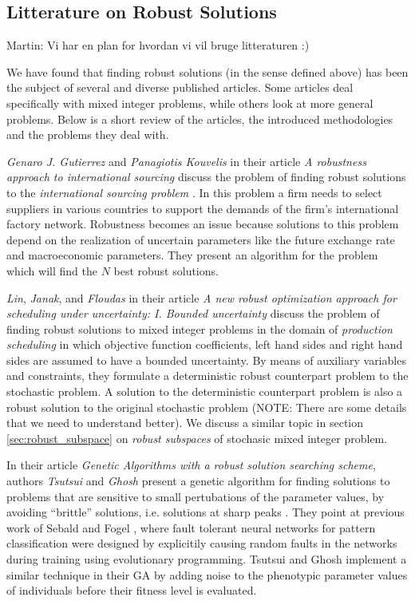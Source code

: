 \subsection{Litterature on Robust Solutions}

Martin: Vi har en plan for hvordan vi vil bruge litteraturen :)

We have found that finding robust solutions (in the sense defined
above) has been the subject of several and diverse published
articles. Some articles deal specifically with mixed integer problems,
while others look at more general problems. Below is a short review of
the articles, the introduced methodologies and the problems they deal
with.

\emph{Genaro J. Gutierrez} and \emph{Panagiotis Kouvelis} in their
article \emph{A robustness approach to international sourcing} discuss
the problem of finding robust solutions to the \emph{international
sourcing problem} \cite{kouvelis}. In this problem a firm needs to
select suppliers in various countries to support the demands of the
firm's international factory network. Robustness becomes an issue
because solutions to this problem depend on the realization of
uncertain parameters like the future exchange rate and macroeconomic
parameters. They present an algorithm for the problem which will find
the $N$ best robust solutions.

\emph{Lin}, \emph{Janak}, and \emph{Floudas} in their article \emph{A
new robust optimization approach for scheduling under uncertainty:
I. Bounded uncertainty} discuss the problem of finding robust
solutions to mixed integer problems in the domain of \emph{production
scheduling} in which objective function coefficients, left hand sides
and right hand sides are assumed to have a bounded uncertainty. By
means of auxiliary variables and constraints, they formulate a
deterministic robust counterpart problem to the stochastic problem. A
solution to the deterministic counterpart problem is also a robust
solution to the original stochastic problem \cite{lin} (NOTE: There
are some details that we need to understand better). We discuss a
similar topic in section \ref{sec:robust_subspace} on \emph{robust
subspaces} of stochasic mixed integer problem.

In their article \emph{Genetic Algorithms with a robust solution
searching scheme}, authors \emph{Tsutsui} and \emph{Ghosh} present a
genetic algorithm for finding solutions to problems that are sensitive
to small pertubations of the parameter values, by avoiding ``brittle''
solutions, i.e. solutions at sharp peaks \cite{tsutsui}. They point at
previous work of Sebald and Fogel \cite{sebald}, where fault tolerant
neural networks for pattern classification were designed by
explicitily causing random faults in the networks during training
using evolutionary programming. Tsutsui and Ghosh implement a similar
technique in their GA by adding noise to the phenotypic parameter
values of individuals before their fitness level is evaluated.


